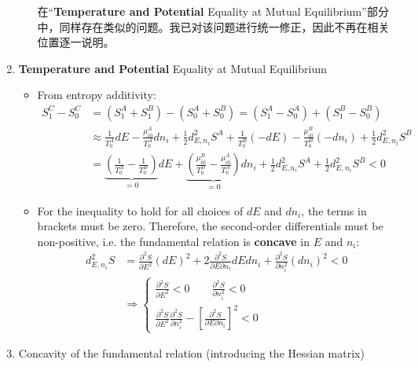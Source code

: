 \begin{thm}
\begin{enumerate}
\begin{itemize}
\begin{zhu}
    在“\textbf{Temperature and Potential} Equality at Mutual Equilibrium”部分中，同样存在类似的问题。我已对该问题进行统一修正，因此不再在相关位置逐一说明。
\end{zhu}
        \end{itemize}
        \item \textbf{Temperature and Potential} Equality at Mutual Equilibrium
        \begin{itemize}
            \item From entropy additivity:
            \begin{align*}
                S^C_1 - S^C_0 &= (S^A_1 + S^B_1) - (S^A_0 + S^B_0) = (S^A_1 - S^A_0) + (S^B_1 - S^B_0)\\
                &\approx \frac{1}{T^A_0} dE - \frac{\mu^A_{i0}}{T^A_0} dn_i + \frac{1}{2} d^2_{E,n_i} S^A
                + \frac{1}{T^B_0} (-dE) - \frac{\mu^B_{i0}}{T^B_0} (-dn_i) + \frac{1}{2} d^2_{E,n_i} S^B\\
                &= \underbrace{\left( \frac{1}{T^A_0} - \frac{1}{T^B_0} \right)}_{=0} dE + \underbrace{\left( \frac{\mu^B_{i0}}{T^B_0} 
                - \frac{\mu^A_{i0}}{T^A_0} \right)}_{=0} dn_i + \frac{1}{2} d^2_{E,n_i} S^A + \frac{1}{2} d^2_{E,n_i} S^B < 0
            \end{align*}
                \item For the inequality to hold for all choices of \( dE \) and \( dn_i \), 
                the terms in brackets must be zero. Therefore, the second-order differentials must be non-positive, 
                i.e. the fundamental relation is \textbf{concave} in \( E \) and \( n_i \):          
\begin{align*}
                d^2_{E,n_i} S &= \frac{\partial^2 S}{\partial E^2} (dE)^2 + 2 \frac{\partial^2 S}{\partial E \partial n_i} dEdn_i + \frac{\partial^2 S}{\partial n_i^2} (dn_i)^2 < 0\\
                &\Rightarrow
                \begin{cases} 
                \frac{\partial^2 S}{\partial E^2} < 0 \qquad \frac{\partial^2 S}{\partial n_i^2} < 0 \\ 
                \frac{\partial^2 S}{\partial E^2} \frac{\partial^2 S}{\partial n_i^2} - \left[ \frac{\partial^2 S}{\partial E \partial n_i} \right]^2 < 0 
                \end{cases}
\end{align*}
        \end{itemize}
    \item Concavity of the fundamental relation (introducing the Hessian matrix)


\end{enumerate}
\end{thm}
